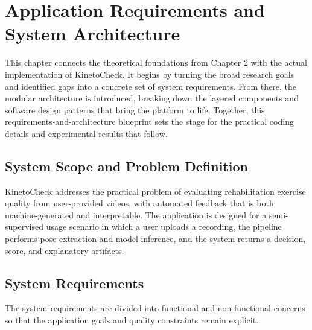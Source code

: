 \chapter{Application Requirements and System Architecture}
\label{chap:architecture}

This chapter connects the theoretical foundations from Chapter 2 with the actual implementation of KinetoCheck. It begins by turning the broad research goals and identified gaps into a concrete set of system requirements. From there, the modular architecture is introduced, breaking down the layered components and software design patterns that bring the platform to life. Together, this requirements-and-architecture blueprint sets the stage for the practical coding details and experimental results that follow.

\section{System Scope and Problem Definition}
KinetoCheck addresses the practical problem of evaluating rehabilitation exercise quality from user-provided videos, with automated feedback that is both machine-generated and interpretable. The application is designed for a semi-supervised usage scenario in which a user uploads a recording, the pipeline performs pose extraction and model inference, and the system returns a decision, score, and explanatory artifacts.

\section{System Requirements}
The system requirements are divided into functional and non-functional concerns so that the application goals and quality constraints remain explicit.

